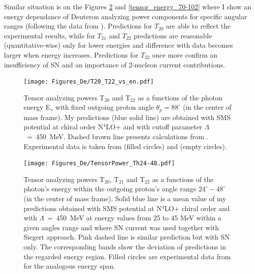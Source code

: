     Similar situation is on the Figures \ref{tensor_energy_24-48} and \ref{tensor_energy_70-102}
    where I show an energy dependance of Deuteron analyzing power components for 
    specific angular ranges (following the data from \cite{rachek2007}).
    Predictions for $T_{20}$ are able to reflect the experimental results,
    while for $T_{21}$ and $T_{22}$ predictions are reasonable (quantitative-wise) 
    only for lower energies and difference with data becomes larger
    when energy increases. Predictions for $T_{22}$ once more 
    confirm an insufficiency of SN and an importance of
    2-nucleon current contributions. 
    

    \begin{figure}[h]
        \begin{center}
        \texttt{[image: Figures\_De/T20\_T22\_vs\_en.pdf]}
        \end{center}
        \caption{Tensor analyzing powers T$_{20}$ and T$_{22}$ as a functions of the photon energy E$_\gamma$
        with fixed outgoing proton angle $\theta_p = 88^{\circ}$ (in the center of mass frame).
        My predictions (blue solid line) are obtained with SMS potential at chiral order N$^4$LO+
        and with cutoff parameter $\Lambda$~=~450~MeV.
        Dashed brown line presents calculations from \cite{Schmitt1989}.
        Experimental data is taken from \cite{rachek2007} (filled circles)
        and \cite{mishev1993} (empty circles).}
        \label{T20_vs_en}
    \end{figure}

    \begin{figure}[h]
        \begin{center}
        \texttt{[image: Figures\_De/TensorPower\_Th24-48.pdf]}
        \end{center}
        \caption{Tensor analyzing powers T$_{20}$, T$_{21}$ and T$_{22}$ as a functions of the
        photon's energy within the outgoing proton's angle range $24^{\circ} - 48^{\circ}$
        (in the center of mass frame).
        Solid blue line is a mean value of my predictions obtained with
        SMS potential at N$^4$LO+ chiral order and with $\Lambda$~=~450~MeV
        at energy values from 25 to 45 MeV within
        a given angles range and
        where SN current was used together with Siegert approach. 
        Pink dashed line is similar prediction but with SN only. 
        The corresponding bands show the deviation of predictions in the regarded
        energy region.
        Filled circles are experimental data
        from \cite{rachek2007} for the analogous energy span.}
        \label{tensor_energy_24-48}
    \end{figure}

